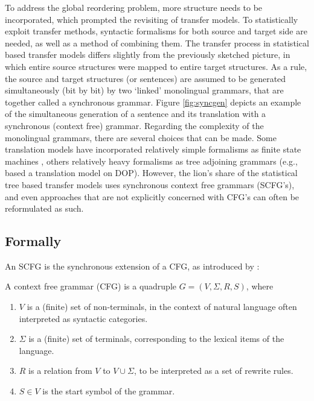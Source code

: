 To address the global reordering problem, more structure needs to be incorporated, which prompted the revisiting of transfer models. To statistically exploit transfer methods, syntactic formalisms for both source and target side are needed, as well as a method of combining them. The transfer process in statistical based transfer models differs slightly from the previously sketched picture, in which entire source structures were mapped to entire target structures. As a rule, the source and target structures (or sentences) are assumed to be generated simultaneously (bit by bit) by two `linked' monolingual grammars, that are together called a synchronous grammar.
 Figure \ref{fig:syncgen} depicts an example of the simultaneous generation of a sentence and its translation with a synchronous (context free) grammar. Regarding the complexity of the monolingual grammars, there are several choices that can be made. Some translation models have incorporated relatively simple formalisms as finite state machines \citep[e.g.,][]{alshawi2000learning}, others relatively heavy formalisms as tree adjoining grammars (e.g., \cite{poutsma2000data} based a translation model on DOP). However, the lion's share of the statistical tree based transfer models uses synchronous context free grammars (SCFG's), and even approaches that are not explicitly concerned with CFG's can often be reformulated as such.
 
\subsection{Formally}

An SCFG is the synchronous extension of a CFG, as introduced by \cite{chomsky1956three}:

\begin{definition}
A context free grammar (CFG) is a quadruple $G = (V, \Sigma, R, S)$, where\begin{enumerate}
\item $V$ is a (finite) set of non-terminals, in the context of natural language often interpreted as syntactic categories.
\item $\Sigma$ is a (finite) set of terminals, corresponding to the lexical items of the language.
\item $R$ is a relation from $V$ to $V\cup\Sigma$, to be interpreted as a set of rewrite rules.
\item $S\in V$ is the start symbol of the grammar.
\end{enumerate}
\end{definition}

